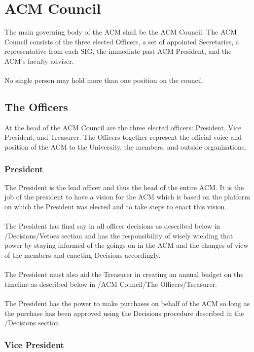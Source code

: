 \documentclass[12pt,titlepage]{article}
\begin{document}
\section{ACM Council}

The main governing body of the ACM shall be the ACM Council. The ACM Council consists of the three elected Officers, a set of appointed Secretaries, a representative from each SIG, the immediate past ACM President, and the ACM's faculty adviser.\\
\\
No single person may hold more than one position on the council.\\

\subsection{The Officers}

At the head of the ACM Council are the three elected officers: President, Vice President, and Treasurer. The Officers together represent the official voice and position of the ACM to the University, the members, and outside organizations.

\subsubsection{President}

The President is the lead officer and thus the head of the entire ACM. It is the job of the president to have a vision for the ACM which is based on the platform on which the President was elected and to take steps to enact this vision.\\
\\
The President has final say in all officer decisions as described below in /Decisions/Vetoes section and has the responsibility of wisely wielding that power by staying informed of the goings on in the ACM and the changes of view of the members and enacting Decisions accordingly.\\
\\
The President must also aid the Treasurer in creating an annual budget on the timeline as described below in /ACM Council/The Officers/Treasurer.\\
\\
The President has the power to make purchases on behalf of the ACM so long as the purchase has been approved using the Decisions procedure described in the /Decisions section.

\subsubsection{Vice President}
\end{document}
